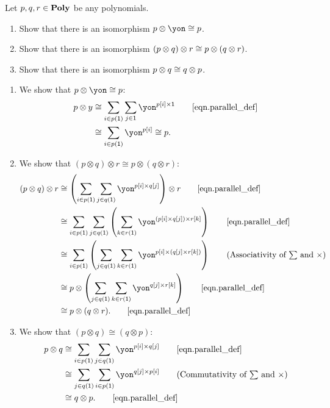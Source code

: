 \documentclass[Book-Poly]{subfiles}
\begin{document}
\begin{exercise}\label{exc.prepare_poly_smc}
Let $p,q,r\in\mathbf{Poly}$ be any polynomials.
\begin{enumerate}
  \item Show that there is an isomorphism $p\otimes\yon\iso p$.
  \item Show that there is an isomorphism $(p\otimes q)\otimes r\cong p\otimes (q\otimes r)$.
  \item Show that there is an isomorphism $p\otimes q \cong q\otimes p$.
 \qedhere
\end{enumerate}
\begin{solution}
\begin{enumerate}
  \item We show that $p\otimes\yon\iso p$:
  \begin{align*}
      p \otimes y &\iso \sum_{i \in p(\1)} \sum_{j \in \1} \yon^{p[i] \times \1} \tag*{\eqref{eqn.parallel_def}} \\
      &\iso \sum_{i \in p(\1)} \yon^{p[i]} \iso p.
  \end{align*}

  \item We show that $(p\otimes q)\otimes r\cong p\otimes (q\otimes r)$:
  \begin{align*}
      (p \otimes q) \otimes r &\iso \left(\sum_{i \in p(\1)} \sum_{j \in q(\1)} \yon^{p[i] \times q[j]}\right) \otimes r \tag*{\eqref{eqn.parallel_def}} \\
      &\iso \sum_{i \in p(\1)} \sum_{j \in q(\1)} \left(\sum_{k \in r(\1)} \yon^{(p[i] \times q[j]) \times r[k]}\right) \tag*{\eqref{eqn.parallel_def}} \\
      &\iso \sum_{i \in p(\1)} \left(\sum_{j \in q(\1)} \sum_{k \in r(\1)} \yon^{p[i] \times (q[j] \times r[k])}\right) \tag{Associativity of $\sum$ and $\times$} \\
      &\iso p \otimes \left(\sum_{j \in q(\1)} \sum_{k \in r(\1)} \yon^{q[j] \times r[k]}\right) \tag*{\eqref{eqn.parallel_def}} \\
      &\iso p \otimes (q \otimes r). \tag*{\eqref{eqn.parallel_def}} \\
  \end{align*}

  \item We show that $(p\otimes q)\cong(q\otimes p)$:
  \begin{align*}
      p \otimes q &\iso \sum_{i \in p(\1)} \sum_{j \in q(\1)} \yon^{p[i] \times q[j]} \tag*{\eqref{eqn.parallel_def}} \\
      &\iso \sum_{j \in q(\1)} \sum_{i \in p(\1)} \yon^{q[j] \times p[i]} \tag{Commutativity of $\sum$ and $\times$} \\
      &\iso q \otimes p. \tag*{\eqref{eqn.parallel_def}} \\
  \end{align*}
\end{enumerate}
\end{solution}
\end{exercise}
\end{document}
